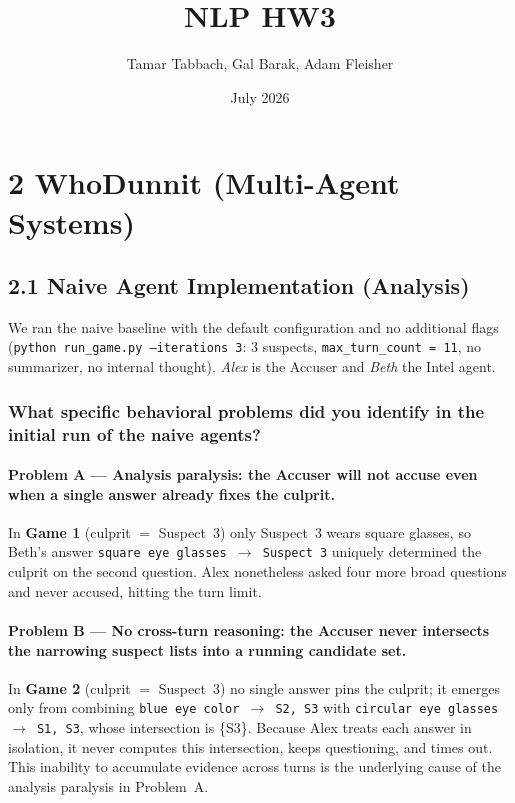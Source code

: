 \documentclass{article}
\title{NLP HW3}
\author{Tamar Tabbach, Gal Barak, Adam Fleisher}
\date{July 2026}
\begin{document}
\maketitle

\section*{2 \quad WhoDunnit (Multi-Agent Systems)}

\subsection*{2.1 \quad Naive Agent Implementation (Analysis)}

We ran the naive baseline with the default configuration and no additional flags
(\texttt{python run\_game.py --iterations 3}: 3 suspects, \texttt{max\_turn\_count = 11},
no summarizer, no internal thought). \emph{Alex} is the Accuser and \emph{Beth} the Intel
agent.

\subsubsection*{What specific behavioral problems did you identify in the initial run of the
naive agents?}

\paragraph{Problem A --- Analysis paralysis: the Accuser will not accuse even when a single
answer already fixes the culprit.} In \textbf{Game 1} (culprit $=$ Suspect~3) only Suspect~3
wears square glasses, so Beth's answer \texttt{square eye glasses $\rightarrow$ Suspect 3}
uniquely determined the culprit on the second question. Alex nonetheless asked four more
broad questions and never accused, hitting the turn limit.

\paragraph{Problem B --- No cross-turn reasoning: the Accuser never intersects the narrowing
suspect lists into a running candidate set.} In \textbf{Game 2} (culprit $=$ Suspect~3) no
single answer pins the culprit; it emerges only from combining
\texttt{blue eye color $\rightarrow$ S2, S3} with \texttt{circular eye glasses $\rightarrow$
S1, S3}, whose intersection is \{S3\}. Because Alex treats each answer in isolation, it never
computes this intersection, keeps questioning, and times out. This inability to accumulate
evidence across turns is the underlying cause of the analysis paralysis in Problem~A.
\end{document}
